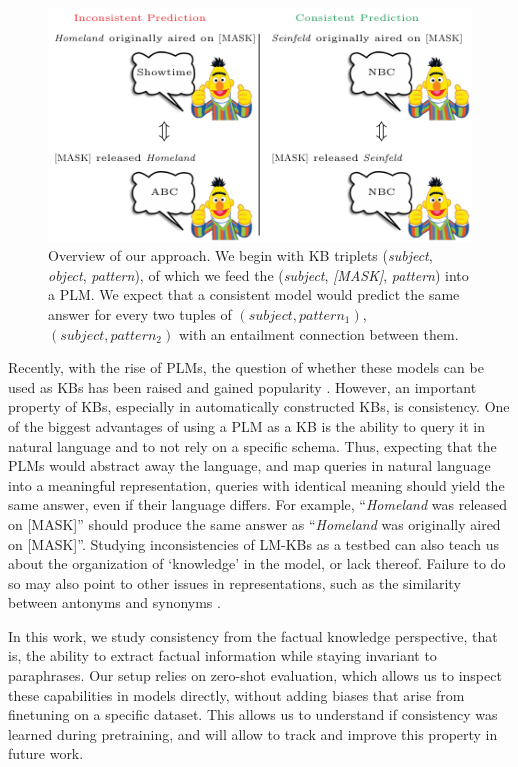 \begin{figure}[t!]
\centering

\includegraphics[width=1.\columnwidth]{figures/overview}

\caption{Overview of our approach. We begin with KB triplets (\textit{subject}, \textit{object}, \textit{pattern}), of which we feed the (\textit{subject}, \textit{[MASK]}, \textit{pattern}) into a PLM. 
We expect that a consistent model would predict the same answer for every two tuples of $(subject, pattern_1)$, $(subject, pattern_2)$ with an entailment connection between them.}
\label{fig:overview}
\end{figure}


Recently, with the rise of PLMs, the question of whether these models can be used as KBs has been raised and gained popularity \cite{lama,petroni2020how,alpaqa}. However, an important property of KBs, especially in automatically constructed KBs, is consistency.
One of the biggest advantages of using a PLM as a KB is the ability to query it in natural language and to not rely on a specific schema.
Thus, expecting that the PLMs would abstract away the language, and map queries in natural language into a meaningful representation, queries with identical meaning should yield the same answer, even if their language differs.
For example, ``\textit{Homeland} was released on [MASK]'' should produce the same answer as ``\textit{Homeland} was originally aired on [MASK]''.
Studying inconsistencies of LM-KBs as a testbed can also teach us about the organization of `knowledge' in the model, or lack thereof. Failure to do so may also point to other issues in representations, such as the similarity between antonyms and synonyms \cite{nguyen2016integrating}.

In this work, we study consistency from the factual knowledge perspective, that is, the ability to extract factual information while staying invariant to paraphrases.
Our setup relies on zero-shot evaluation, which allows us to
inspect these capabilities in models directly, without
adding biases that arise from finetuning on a specific
dataset. This allows us to understand if consistency was learned during pretraining, and will allow to track and improve this property in future work. %


